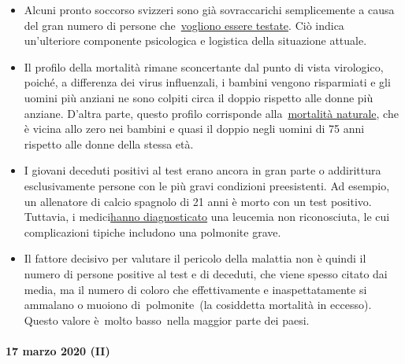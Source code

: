 \begin{itemize}
\tightlist
\item
  Alcuni pronto soccorso svizzeri sono già sovraccarichi semplicemente a
  causa del gran numero di persone
  che~\href{https://insideparadeplatz.ch/2020/03/16/notfall-stationen-bereits-seit-tagen-am-anschlag/}{vogliono
  essere testate}. Ciò indica un'ulteriore componente psicologica e
  logistica della situazione attuale.
\item
  Il profilo della mortalità rimane sconcertante dal punto di vista
  virologico, poiché, a differenza dei virus influenzali, i bambini
  vengono risparmiati e gli uomini più anziani ne sono colpiti circa il
  doppio rispetto alle donne più anziane. D'altra parte, questo profilo
  corrisponde
  alla~\href{http://www.gbe-bund.de/gbe10/abrechnung.prc_abr_test_logon?p_uid=gast\&p_aid=0\&p_knoten=FID\&p_sprache=D\&p_suchstring=820}{mortalità
  naturale}, che è vicina allo zero nei bambini e quasi il doppio negli
  uomini di 75 anni rispetto alle donne della stessa età.
\item
  I giovani deceduti positivi al test erano ancora in gran parte o
  addirittura esclusivamente persone con le più gravi condizioni
  preesistenti. Ad esempio, un allenatore di calcio spagnolo di 21 anni
  è morto con un test positivo. Tuttavia, i
  medici\href{https://sports.yahoo.com/spanish-football-coach-francisco-garcia-163153573.html}{hanno
  diagnosticato} una leucemia non riconosciuta, le cui complicazioni
  tipiche includono una polmonite grave.
\item
  Il fattore decisivo per valutare il pericolo della malattia non è
  quindi il numero di persone positive al test e di deceduti, che viene
  spesso citato dai media, ma il numero di coloro che effettivamente e
  inaspettatamente si ammalano o muoiono di~polmonite~(la cosiddetta
  mortalità in eccesso). Questo valore è~molto basso~nella maggior parte
  dei paesi.
\end{itemize}

\hypertarget{17-marzo-2020-ii}{%
\paragraph{17 marzo 2020 (II)}\label{17-marzo-2020-ii}}

